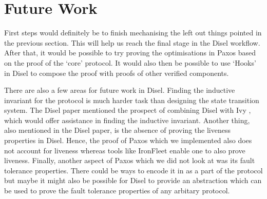\section{Future Work}
First steps would definitely be to finish mechanising the left out things
pointed in the previous section. This will help us reach the final stage in the Disel
workflow. After that, it would be possible to try proving the optimisations
in Paxos based on the proof of the `core' protocol. It would also then be possible
to use `Hooks' \cite{9} in Disel to compose the proof with proofs of other
verified components.

There are also a few areas for future work in Disel.
Finding the inductive invariant for the protocol is much harder task than
designing the state transition system. The Disel paper \cite{9} mentioned the prospect
of combining Disel with Ivy \cite{19}, which would offer assistance in finding
the inductive invariant. Another thing, also mentioned in the Disel paper, is
the absence of proving the liveness properties in Disel. Hence, the proof of
Paxos which we implemented also does not account for liveness whereas tools like
IronFleet \cite{15} enable one to also prove liveness.
Finally, another aspect of Paxos which we did not look at was its fault
tolerance properties. There could be ways to encode it in as a part of the
protocol but maybe it might also be possible for Disel to provide an
abstraction which can be used to prove the fault tolerance properties of
any arbitary protocol.
